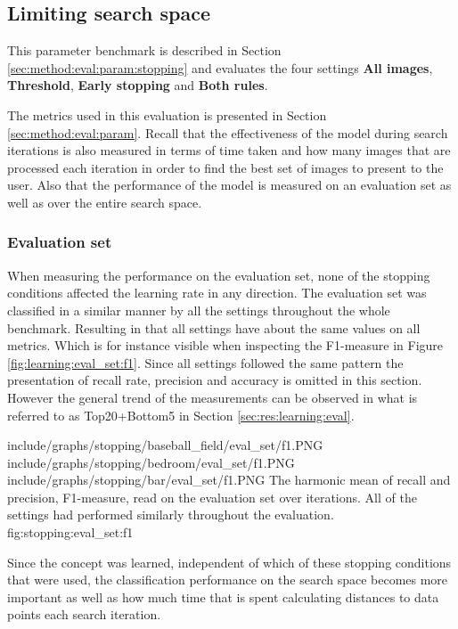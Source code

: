 
\subsection{Limiting search space}
\label{sec:res:stopping}

This parameter benchmark is described in Section \ref{sec:method:eval:param:stopping} and evaluates the four settings 
\textbf{All images}, \textbf{Threshold}, \textbf{Early stopping} and \textbf{Both rules}.

The metrics used in this evaluation is presented in Section \ref{sec:method:eval:param}. Recall that the effectiveness of the model during search iterations is also measured in terms of time taken and how many images that are processed each iteration in order to find the best set of images to present to the user. Also that the performance of the model is measured on an evaluation set as well as over the entire search space. 

\subsubsection{Evaluation set}
When measuring the performance on the evaluation set, none of the stopping conditions affected the learning rate in any direction. The evaluation set was  classified in a similar manner by all the settings throughout the whole benchmark. 
Resulting in that all settings have about the same values on all metrics. Which is for instance visible when inspecting the F1-measure in Figure \ref{fig:learning:eval_set:f1}. Since all settings followed the same pattern the presentation of recall rate, precision and accuracy is omitted in this section. However the general trend of the measurements can be observed in what is referred to as Top20+Bottom5 in Section \ref{sec:res:learning:eval}.

\tripfigure
{include/graphs/stopping/baseball_field/eval_set/f1.PNG}
{include/graphs/stopping/bedroom/eval_set/f1.PNG}
{include/graphs/stopping/bar/eval_set/f1.PNG}
{The harmonic mean of recall and precision, F1-measure, read on the evaluation set over iterations. All of the settings had performed similarly throughout the evaluation.}
{fig:stopping:eval_set:f1}

Since the concept was learned, independent of which of these stopping conditions that were used, the classification performance on the search space becomes more important as well as how much time that is spent calculating distances to data points each search iteration.

